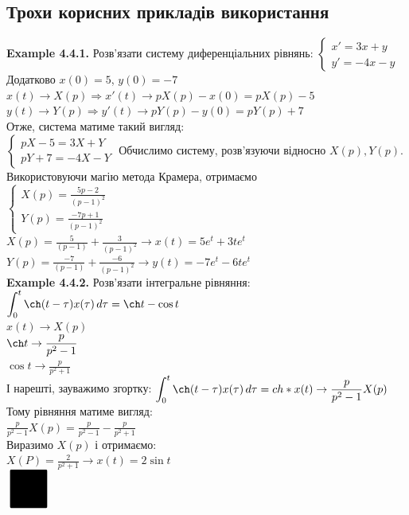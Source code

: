 \documentclass{math_library}
\begin{document}
\subsection{Трохи корисних прикладів використання}
\textbf{Example 4.4.1.} Розв'язати систему диференціальних рівнянь:
$\begin{cases}
x' = 3x + y \\
y' = -4x - y
\end{cases}
$\\
Додатково $x(0) = 5$, $y(0) = -7$\\
$x(t) \rightarrow X(p) \Rightarrow x'(t) \rightarrow pX(p) - x(0) = pX(p) - 5$\\
$y(t) \rightarrow Y(p) \Rightarrow y'(t) \rightarrow pY(p) - y(0) = pY(p) + 7$\\
Отже, система матиме такий вигляд:\\
$\begin{cases}
pX - 5 = 3X + Y\\
pY + 7 = -4X - Y
\end{cases}
$
Обчислимо систему, розв'язуючи відносно $X(p), Y(p)$. Використовуючи магію метода Крамера, отримаємо\\
$\begin{cases}
\displaystyle X(p) = \frac{5p-2}{(p-1)^2}\\
\displaystyle Y(p) = \frac{-7p+1}{(p-1)^2}
\end{cases}
$\\
$\displaystyle X(p) = \frac{5}{(p-1)} + \frac{3}{(p-1)^2} \rightarrow x(t) = 5e^t + 3t e^t$\\
$\displaystyle Y(p) = \frac{-7}{(p-1)} + \frac{-6}{(p-1)^2} \rightarrow y(t) = -7e^t - 6t e^t$
\bigskip \\
\textbf{Example 4.4.2.} Розв'язати інтегральне рівняння:\\
$\displaystyle \int_0^t \ch (t- \tau) x(\tau) \,d\tau = \ch t - \cos t$\\
$x(t) \rightarrow X(p)$\\
$\ch t \rightarrow \displaystyle \frac{p}{p^2-1}$\\
$\cos t \rightarrow \displaystyle \frac{p}{p^2+1}$\\
І нарешті, зауважимо згортку: $\displaystyle \int_0^t \ch(t-\tau) x(\tau)\,d\tau = ch * x(t) \rightarrow \frac{p}{p^2-1} X(p)$
Тому рівняння матиме вигляд:\\
$\displaystyle \frac{p}{p^2-1} X(p) = \frac{p}{p^2-1} - \frac{p}{p^2+1}$\\
Виразимо $X(p)$ і отримаємо:\\
$\displaystyle X(P) = \frac{2}{p^2+1} \rightarrow x(t) = 2 \sin t$
\bigskip \\
$\scaleobj{5}{\blacksquare}$
\fi
\end{document}
